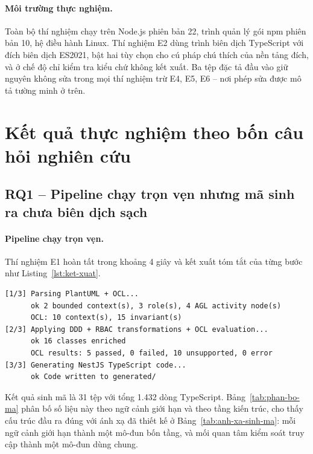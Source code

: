 \paragraph{Môi trường thực nghiệm.}
Toàn bộ thí nghiệm chạy trên Node.js phiên bản 22, trình quản lý gói npm phiên bản 10, hệ điều hành Linux. Thí nghiệm E2 dùng trình biên dịch TypeScript với đích biên dịch ES2021, bật hai tùy chọn cho cú pháp chú thích của nền tảng đích, và ở chế độ chỉ kiểm tra kiểu chứ không kết xuất. Ba tệp đặc tả đầu vào giữ nguyên không sửa trong mọi thí nghiệm trừ E4, E5, E6 -- nơi phép sửa được mô tả tường minh ở trên.

\section{Kết quả thực nghiệm theo bốn câu hỏi nghiên cứu}
\label{sec:ket-qua}

\subsection{RQ1 -- Pipeline chạy trọn vẹn nhưng mã sinh ra chưa biên dịch sạch}

\paragraph{Pipeline chạy trọn vẹn.}
Thí nghiệm E1 hoàn tất trong khoảng 4 giây và kết xuất tóm tắt của từng bước như Listing~\ref{lst:ket-xuat}.

\begin{lstlisting}[caption={Kết xuất của thí nghiệm E1},label={lst:ket-xuat}]
[1/3] Parsing PlantUML + OCL...
      ok 2 bounded context(s), 3 role(s), 4 AGL activity node(s)
      OCL: 10 context(s), 15 invariant(s)
[2/3] Applying DDD + RBAC transformations + OCL evaluation...
      ok 16 classes enriched
      OCL results: 5 passed, 0 failed, 10 unsupported, 0 error
[3/3] Generating NestJS TypeScript code...
      ok Code written to generated/
\end{lstlisting}

Kết quả sinh mã là 31 tệp với tổng 1.432 dòng TypeScript. Bảng~\ref{tab:phan-bo-ma} phân bố số liệu này theo ngữ cảnh giới hạn và theo tầng kiến trúc, cho thấy cấu trúc đầu ra đúng với ánh xạ đã thiết kế ở Bảng~\ref{tab:anh-xa-sinh-ma}: mỗi ngữ cảnh giới hạn thành một mô-đun bốn tầng, và mối quan tâm kiểm soát truy cập thành một mô-đun dùng chung.

